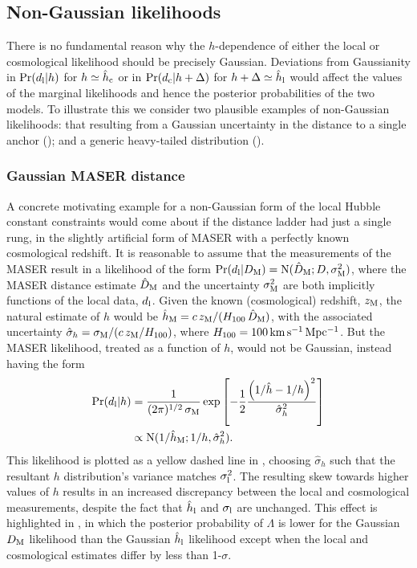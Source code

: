 \documentclass[a4paper,fleqn,usenatbib]{mnras}
\newcommand{\msame}{\Lambda}
\newcommand{\hlobs}{\hat{h}_{\rm l}}
\newcommand{\hcobs}{\hat{h}_{\rm c}}
\newcommand{\hlerr}{\sigma_{\rm l}}
\newcommand{\datl}{d_{\rm l}}
\newcommand{\datc}{d_{\rm c}}
\newcommand{\kmsmpc}{\ensuremath{{\rm km\,s^{-1}\,Mpc^{-1}}}}
\begin{document}
{\subsection{Non-Gaussian likelihoods}
\label{section:nongausslik}

There is no fundamental reason why the $h$-dependence
of either the local or cosmological likelihood should be precisely Gaussian.
Deviations from Gaussianity
in $\prob(\datl | h )$ 
for $h \simeq \hcobs$
or in 
$\prob(\datc | h + \Delta)$ 
for $h + \Delta \simeq \hlobs$
would affect the values of the marginal likelihoods and hence the 
posterior probabilities of the two models.
To illustrate this we consider two plausible examples of non-Gaussian 
likelihoods:
that resulting from a Gaussian uncertainty in the distance to a 
single anchor
();
and 
a generic heavy-tailed distribution 
().


\subsubsection{Gaussian MASER distance}
\label{section:maser_gauss}

A concrete motivating example for a non-Gaussian form of the 
local Hubble constant constraints would come about if the 
distance ladder had just a single rung, in the slightly artificial
form of MASER with a perfectly known cosmological redshift.
It is reasonable to assume that the measurements of the MASER 
result in a likelihood of the form
$\prob(\datl | D_{\rm M})
  = \normal(\hat{D}_{\rm M}; D, \sigma_{\rm M}^2)$,
where the MASER distance estimate $\hat{D}_{\rm M}$
and the uncertainty $\sigma_{\rm M}^2$ are both implicitly functions 
of the local data, $\datl$.
Given the known (cosmological) redshift, $z_{\rm M}$, 
the natural estimate of $h$ would be 
$\hat{h}_{\rm M} = c \, z_{\rm M} / (H_{100} \, \hat{D}_{\rm M})$,
with the associated uncertainty 
$\hat{\sigma}_{h} = \sigma_{\rm M} / (c \, z_{\rm M} / H_{100})$,
where $H_{100} = 100 \, \kmsmpc$.
But the MASER likelihood, treated as a function of $h$, 
would not be Gaussian, instead having the form
\begin{align}
\prob(\datl | h) & = 
  \frac{1}{(2 \pi)^{1/2} \, \sigma_{\rm M}}
  \exp\left[-\frac{1}{2} 
  \frac{\left( 1/\hat{h} - 1/h\right)^2}{\hat{\sigma}_h^{2}}
  \right] \\
  & \propto \normal(1/\hat{h}_{\rm M}; 1/h, \hat{\sigma}_h^2).\nonumber
\end{align}
This likelihood is plotted as a yellow dashed line in , choosing $\hat{\sigma}_h$ such that the resultant $h$ distribution's variance matches $\hlerr^2$. The resulting skew towards higher values of $h$ results in an increased discrepancy between the local and cosmological measurements, despite the fact that $\hlobs$ and $\hlerr$ are unchanged. This effect is highlighted  in , in which the posterior probability of $\msame$ is lower for the Gaussian $D_{\rm M}$ likelihood than the Gaussian $\hlobs$ likelihood except when the local and cosmological estimates differ by less than 1-$\sigma$.

}
\end{document}
